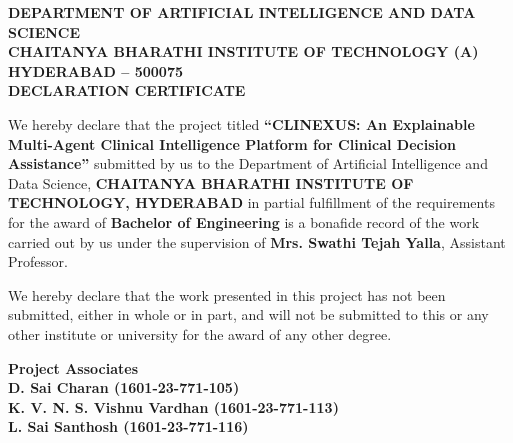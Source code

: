 \documentclass[12pt,a4paper]{report}
\begin{document}
\newpage
\begin{center}
    \vspace{0.4cm}
    
    \textbf{\large DEPARTMENT OF ARTIFICIAL INTELLIGENCE AND DATA SCIENCE}\\[0.1cm]
    \textbf{\large CHAITANYA BHARATHI INSTITUTE OF TECHNOLOGY (A)}\\[0.1cm]
    \textbf{\large HYDERABAD -- 500075}\\[1.0cm]
    
    \textbf{\Large DECLARATION CERTIFICATE}\\[1.0cm]
\end{center}

We hereby declare that the project titled \textbf{``CLINEXUS: An Explainable Multi-Agent Clinical Intelligence Platform for Clinical Decision Assistance''} submitted by us to the Department of Artificial Intelligence and Data Science, \textbf{CHAITANYA BHARATHI INSTITUTE OF TECHNOLOGY, HYDERABAD} in partial fulfillment of the requirements for the award of \textbf{Bachelor of Engineering} is a bonafide record of the work carried out by us under the supervision of \textbf{Mrs. Swathi Tejah Yalla}, Assistant Professor. 

We hereby declare that the work presented in this project has not been submitted, either in whole or in part, and will not be submitted to this or any other institute or university for the award of any other degree.

\vspace{3.5cm}

\begin{flushright}
    \textbf{Project Associates}\\[0.5cm]
    \textbf{D. Sai Charan (1601-23-771-105)}\\[0.2cm]
    \textbf{K. V. N. S. Vishnu Vardhan (1601-23-771-113)}\\[0.2cm]
    \textbf{L. Sai Santhosh (1601-23-771-116)}\\
\end{flushright}
\end{document}
